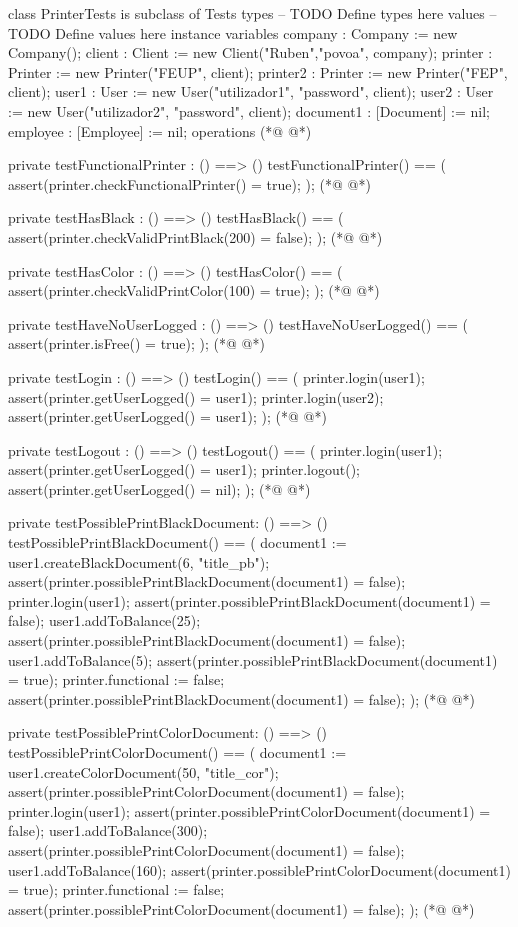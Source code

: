 \begin{vdmpp}[breaklines=true]
class PrinterTests is subclass of Tests
types
-- TODO Define types here
values
-- TODO Define values here
instance variables
company : Company := new Company();
client : Client := new Client("Ruben","povoa", company);
printer : Printer := new Printer("FEUP", client);
printer2 : Printer := new Printer("FEP", client);
user1 : User := new User("utilizador1", "password", client);
user2 : User := new User("utilizador2", "password", client);
document1 : [Document] := nil;
employee : [Employee] := nil;
operations
(*@
\label{testFunctionalPrinter:16}
@*)

private testFunctionalPrinter : () ==> ()
testFunctionalPrinter() ==
(
 assert(printer.checkFunctionalPrinter() = true);
);
(*@
\label{testHasBlack:22}
@*)

private testHasBlack : () ==> ()
testHasBlack() == 
(
 assert(printer.checkValidPrintBlack(200) = false);
);
(*@
\label{testHasColor:28}
@*)

private testHasColor : () ==> ()
testHasColor() == 
(
 assert(printer.checkValidPrintColor(100) = true);
);
(*@
\label{testHaveNoUserLogged:34}
@*)

private testHaveNoUserLogged : () ==> ()
testHaveNoUserLogged() == 
(
assert(printer.isFree() = true);
);
(*@
\label{testLogin:40}
@*)

private testLogin : () ==> ()
testLogin() == 
(
printer.login(user1);
assert(printer.getUserLogged() = user1);
printer.login(user2);
assert(printer.getUserLogged() = user1);
);
(*@
\label{testLogout:49}
@*)

private testLogout : () ==> ()
testLogout() == 
(
printer.login(user1);
assert(printer.getUserLogged() = user1);
printer.logout();
assert(printer.getUserLogged() = nil);
);
(*@
\label{testPossiblePrintBlackDocument:58}
@*)

private testPossiblePrintBlackDocument: () ==> ()
testPossiblePrintBlackDocument() ==
(
document1 := user1.createBlackDocument(6, "title_pb");
assert(printer.possiblePrintBlackDocument(document1) = false);
printer.login(user1);
assert(printer.possiblePrintBlackDocument(document1) = false);
user1.addToBalance(25);
assert(printer.possiblePrintBlackDocument(document1) = false);
user1.addToBalance(5);
assert(printer.possiblePrintBlackDocument(document1) = true);
printer.functional := false;
assert(printer.possiblePrintBlackDocument(document1) = false);
);
(*@
\label{testPossiblePrintColorDocument:73}
@*)

private testPossiblePrintColorDocument: () ==> ()
testPossiblePrintColorDocument() ==
(
document1 := user1.createColorDocument(50, "title_cor");
assert(printer.possiblePrintColorDocument(document1) = false);
printer.login(user1);
assert(printer.possiblePrintColorDocument(document1) = false);
user1.addToBalance(300);
assert(printer.possiblePrintColorDocument(document1) = false);
user1.addToBalance(160);
assert(printer.possiblePrintColorDocument(document1) = true);
printer.functional := false;
assert(printer.possiblePrintColorDocument(document1) = false);
);
(*@
\label{testPrintBlackDocument:88}
@*)


\end{vdmpp}

